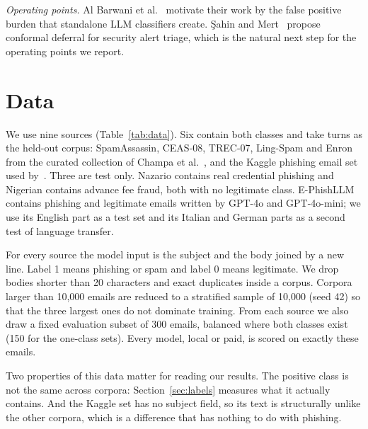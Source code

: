 \textit{Operating points.} Al Barwani et al.~\cite{ragfp} motivate their work by
the false positive burden that standalone LLM classifiers create. \c{S}ahin and
Mert~\cite{triage} propose conformal deferral for security alert triage, which
is the natural next step for the operating points we report.

\section{Data}

We use nine sources (Table~\ref{tab:data}). Six contain both classes and take
turns as the held-out corpus: SpamAssassin, CEAS-08, TREC-07, Ling-Spam and
Enron from the curated collection of Champa et al.~\cite{champa}, and the
Kaggle phishing email set used by~\cite{uddin}. Three are test only. Nazario
contains real credential phishing and Nigerian contains advance fee fraud,
both with no legitimate class. E-PhishLLM~\cite{ephishgen} contains phishing
and legitimate emails written by GPT-4o and GPT-4o-mini; we use its English
part as a test set and its Italian and German parts as a second test of
language transfer.

For every source the model input is the subject and the body joined by a new
line. Label 1 means phishing or spam and label 0 means legitimate. We drop
bodies shorter than 20 characters and exact duplicates inside a corpus.
Corpora larger than 10{,}000 emails are reduced to a stratified sample of
10{,}000 (seed 42) so that the three largest ones do not dominate training.
From each source we also draw a fixed evaluation subset of 300 emails,
balanced where both classes exist (150 for the one-class sets). Every model,
local or paid, is scored on exactly these emails.

Two properties of this data matter for reading our results. The positive class
is not the same across corpora: Section~\ref{sec:labels} measures what it
actually contains. And the Kaggle set has no subject field, so its text is
structurally unlike the other corpora, which is a difference that has nothing
to do with phishing.
